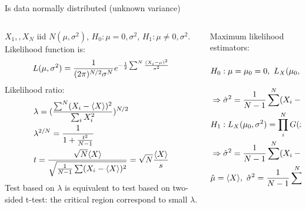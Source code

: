 \documentclass[asd-beamer.tex]{subfiles}%
\begin{document}
\begin{wordonframe}{Is data normally distributed (unknown variance)}
\begin{columns}[T]
	\begin{column}{0.55\textwidth}
$X_1,,X_N$ iid $N(\mu,\sigma^2)$, $H_0: \mu=0,\sigma^2$, $H_1: \mu\neq0,\sigma^2$.
Likelihood function is: 
\begin{equation*}
L(\mu,\sigma^2)=\frac{1}{(2\pi)^{N/2}\sigma^N}e^{-\frac{1}{2}\sum^N\frac{(X_i-\mu)^2}{\sigma^2}}
\end{equation*}
Likelihood ratio:
\begin{align*}
&\lambda=(\frac{\sum^N(X_i-\langle X \rangle)^2}{\sum_iX_i^2})^{N/2}\\
&\lambda^{2/N}=\frac{1}{1+\frac{t^2}{N-1}}\\
&t=\frac{\sqrt{N}\langle X \rangle}{\sqrt{\frac{1}{N-1}\sum(X_i-\langle X \rangle)^2}}=\sqrt{N}\frac{\langle X \rangle}{s}
\end{align*}
Test based on $\lambda$ is equivalent to test based on two-sided t-test: the critical region correspond to small $\lambda$.
	\end{column}
	\begin{column}{0.45\textwidth}
Maximum likelihood estimators:
\begin{align*}
&H_0: \mu=\mu_0=0,\ L_X(\mu_0,\sigma^2)=\prod_i^NG(x_i-\mu_0,\sigma^2)\\
&\Rightarrow \hat{\sigma}^2=\frac{1}{N-1}\sum^N(X_i-\exv{X})^2\\
&H_1: L_X(\mu_0,\sigma^2)=\prod_i^NG(x_i-\mu_0,\sigma^2)\\
&\Rightarrow \hat{\sigma}^2=\frac{1}{N-1}\sum^N(X_i-\exv{X})^2\\
&\hat{\mu}=\exv{X},\ \hat{\sigma}^2=\frac{1}{N-1}\sum^N(X_i-\exv{X})^2
\end{align*}
	\end{column}
\end{columns}
\end{wordonframe}
\end{document}
